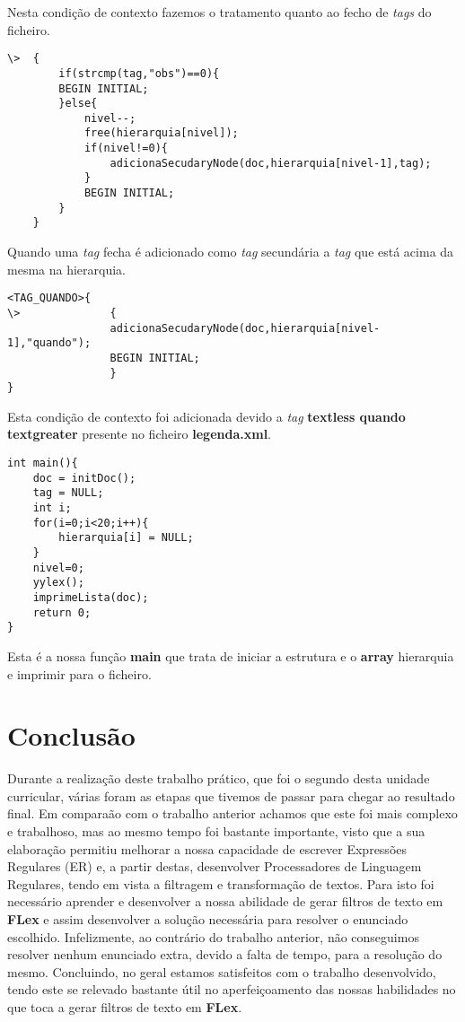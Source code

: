 \documentclass{report}
\begin{document}
    Nesta condição de contexto fazemos o tratamento quanto ao fecho de \textit{tags} do ficheiro.

\begin{verbatim}
\>  {
        if(strcmp(tag,"obs")==0){
        BEGIN INITIAL;
        }else{
            nivel--;
            free(hierarquia[nivel]);
            if(nivel!=0){
                adicionaSecudaryNode(doc,hierarquia[nivel-1],tag);
            }
            BEGIN INITIAL;
        }
    }
\end{verbatim}

    Quando uma \textit{tag} fecha é adicionado como \textit{tag} secundária a \textit{tag} que está acima da mesma na hierarquia.

\begin{verbatim}
<TAG_QUANDO>{
\>              {
                adicionaSecudaryNode(doc,hierarquia[nivel-1],"quando");
                BEGIN INITIAL;  
                }   
}
\end{verbatim}
    
    Esta condição de contexto foi adicionada devido a \textit{tag} \textbf{textless quando textgreater} presente no ficheiro \textbf{legenda.xml}.


\begin{verbatim}
int main(){
    doc = initDoc();
    tag = NULL;
    int i;
    for(i=0;i<20;i++){
        hierarquia[i] = NULL;
    }
    nivel=0;
    yylex();
    imprimeLista(doc);
    return 0;
}
\end{verbatim}
    
    Esta é a nossa função \textbf{main} que trata de iniciar a estrutura e o \textbf{array} hierarquia e imprimir para o ficheiro.



\chapter{Conclusão} \label{concl}

    Durante a realização deste trabalho prático, que foi o segundo desta unidade curricular, várias foram as etapas que tivemos de passar para chegar ao resultado final.
    Em comparaão com o trabalho anterior achamos que este foi mais complexo e trabalhoso, mas ao mesmo tempo foi bastante importante, visto que a sua elaboração permitiu melhorar a nossa capacidade de escrever Expressões Regulares (ER) e, a partir destas, desenvolver Processadores de Linguagem Regulares, tendo em vista a filtragem e transformação de textos.
    Para isto foi necessário aprender e desenvolver a nossa abilidade de gerar filtros de texto em \textbf{FLex} e assim desenvolver a solução necessária para resolver o enunciado escolhido.
    Infelizmente, ao contrário do trabalho anterior, não conseguimos resolver nenhum enunciado extra, devido a falta de tempo, para a resolução do mesmo.
    Concluindo, no geral estamos satisfeitos com o trabalho desenvolvido, tendo este se relevado bastante útil no aperfeiçoamento das nossas habilidades no que toca a gerar filtros de texto em \textbf{FLex}.
    




\end{document}
